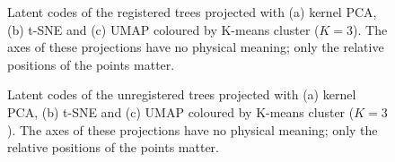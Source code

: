 
\begin{figure}[p]                       %
  \centering
  {\small {} \quad {} \quad {}}  %
  \par\smallskip
  \par\vspace{3pt}
  \par\vspace{3pt}
  \caption{Latent codes of the registered trees projected with (a) kernel PCA, (b) t-SNE and (c) UMAP coloured by K-means cluster ($K=3$). The axes of these projections have no physical meaning; only the relative positions of the points matter.}
  \label{fig:clust_kmeans_proj_reg}
\end{figure}

\begin{figure}[p]                       %
  \centering
  {\small {} \quad {} \quad {}}  %
  \par\smallskip
  \par\vspace{3pt}
  \par\vspace{3pt}
  \caption{Latent codes of the unregistered trees projected with (a) kernel PCA, (b) t-SNE and (c) UMAP coloured by K-means cluster ($K=3$). The axes of these projections have no physical meaning; only the relative positions of the points matter.}
  \label{fig:clust_kmeans_proj_unreg}
\end{figure}

